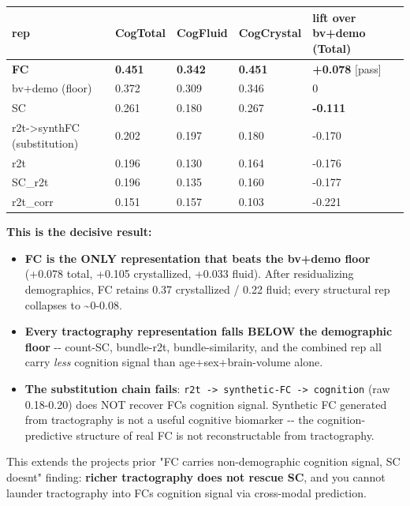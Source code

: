 {\def\LTcaptype{none} %
\begin{longtable}[]{@{}lllll@{}}
\toprule\noalign{}
rep & CogTotal & CogFluid & CogCrystal & lift over bv+demo (Total) \\
\midrule\noalign{}
\endhead
\bottomrule\noalign{}
\endlastfoot
\textbf{FC} & \textbf{0.451} & \textbf{0.342} & \textbf{0.451} & \textbf{+0.078} {[}pass{]} \\
bv+demo (floor) & 0.372 & 0.309 & 0.346 & 0 \\
SC & 0.261 & 0.180 & 0.267 & \textbf{-0.111} \\
r2t-\textgreater synthFC (substitution) & 0.202 & 0.197 & 0.180 & -0.170 \\
r2t & 0.196 & 0.130 & 0.164 & -0.176 \\
SC\_r2t & 0.196 & 0.135 & 0.160 & -0.177 \\
r2t\_corr & 0.151 & 0.157 & 0.103 & -0.221 \\
\end{longtable}
}

\textbf{This is the decisive result:}

\begin{itemize}
\tightlist
\item
  \textbf{FC is the ONLY representation that beats the bv+demo floor} (+0.078 total, +0.105 crystallized, +0.033 fluid). After residualizing demographics, FC retains 0.37 crystallized / 0.22 fluid; every structural rep collapses to \textasciitilde0-0.08.
\item
  \textbf{Every tractography representation falls BELOW the demographic floor} -\/- count-SC, bundle-r2t, bundle-similarity, and the combined rep all carry \emph{less} cognition signal than age+sex+brain-volume alone.
\item
  \textbf{The substitution chain fails}: \texttt{r2t\ -\textgreater{}\ synthetic-FC\ -\textgreater{}\ cognition} (raw 0.18-0.20) does NOT recover FC\textquotesingle s cognition signal. Synthetic FC generated from tractography is not a useful cognitive biomarker -\/- the cognition-predictive structure of real FC is not reconstructable from tractography.
\end{itemize}

This extends the project\textquotesingle s prior "FC carries non-demographic cognition signal, SC doesn\textquotesingle t" finding: \textbf{richer tractography does not rescue SC}, and you cannot launder tractography into FC\textquotesingle s cognition signal via cross-modal prediction.

